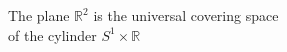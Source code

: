\documentclass[preview]{standalone}
\begin{document}
\begin{center}
The plane $\mathbb{R}^2$ is the universal covering space\\of the cylinder $S^1 \times \mathbb{R}$
\end{center}
\end{document}
